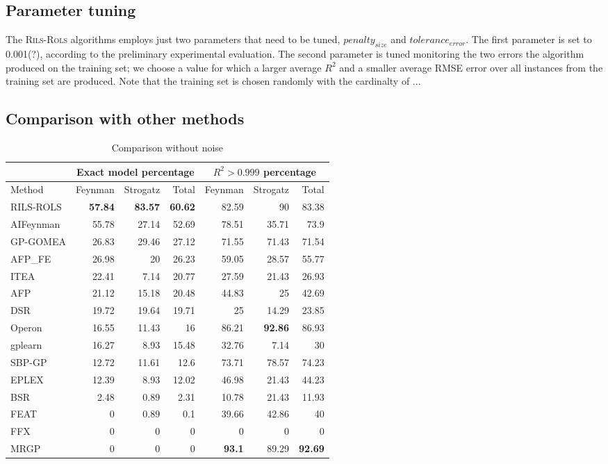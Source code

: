 \documentclass[a4paper,12pt]{elsarticle}
\begin{document}
\subsection{Parameter tuning}
The \textsc{Rils}-\textsc{Rols} algorithms employs just two parameters that need to be tuned, $penalty_{size}$ and $tolerance_{error}$. The first parameter is set to 0.001(?), according to the preliminary experimental evaluation. The second parameter is tuned monitoring the two errors the algorithm produced on the training set; we choose a value for which a larger average $R^2$ and a smaller average RMSE error over all instances from the training set are produced. Note that the training set is chosen randomly with the cardinalty of ... 



\subsection{Comparison with other methods}
\begin{table}[!htb]
	\caption{Comparison without noise}\label{tab:comp_noise0}
	\centering
		\begin{tabular}{l|rrr|rrr} \hline
			& \multicolumn{3}{c|}{Exact model percentage} & \multicolumn{3}{c}{$R^2 > 0.999$ percentage}\\ \hline
			Method & Feynman & Strogatz & Total & Feynman & Strogatz & Total \\ \hline
			RILS-ROLS&\bf{57.84}&\bf{83.57}&\bf{60.62}&82.59&90&83.38\\
			AIFeynman&55.78&27.14&52.69&78.51&35.71&73.9\\
			GP-GOMEA&26.83&29.46&27.12&71.55&71.43&71.54\\
			AFP\_FE&26.98&20&26.23&59.05&28.57&55.77\\
			ITEA&22.41&7.14&20.77&27.59&21.43&26.93\\
			AFP&21.12&15.18&20.48&44.83&25&42.69\\
			DSR&19.72&19.64&19.71&25&14.29&23.85\\
			Operon&16.55&11.43&16&86.21&\bf{92.86}&86.93\\
			gplearn&16.27&8.93&15.48&32.76&7.14&30\\
			SBP-GP&12.72&11.61&12.6&73.71&78.57&74.23\\
			EPLEX&12.39&8.93&12.02&46.98&21.43&44.23\\
			BSR&2.48&0.89&2.31&10.78&21.43&11.93\\
			FEAT&0&0.89&0.1&39.66&42.86&40\\
			FFX&0&0&0&0&0&0\\
			MRGP&0&0&0&\bf{93.1}&89.29&\bf{92.69}\\
			\hline
		\end{tabular}
\end{table}
\end{document}
